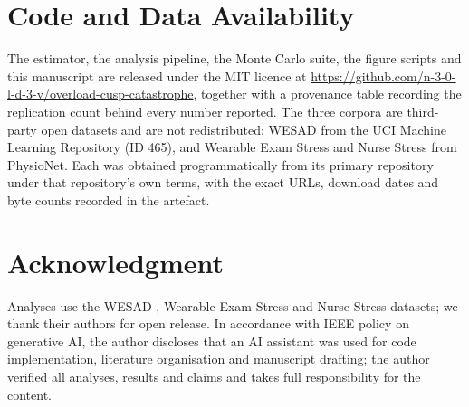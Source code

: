 \documentclass[conference]{IEEEtran}
\begin{document}
\section*{Code and Data Availability}
The estimator, the analysis pipeline, the Monte Carlo suite, the figure scripts
and this manuscript are released under the MIT licence at
\url{https://github.com/n-3-0-l-d-3-v/overload-cusp-catastrophe}, together with
a provenance table recording the replication count behind every number
reported. The three corpora are third-party open datasets and are not
redistributed: WESAD from the UCI Machine Learning Repository (ID 465), and
Wearable Exam Stress and Nurse Stress from PhysioNet. Each was obtained
programmatically from its primary repository under that repository's own terms,
with the exact URLs, download dates and byte counts recorded in the artefact.

\section*{Acknowledgment}
Analyses use the WESAD \cite{schmidt2018wesad}, Wearable Exam Stress
\cite{amin2022exam} and Nurse Stress \cite{hosseini2022nurse} datasets; we
thank their authors for open release. In accordance with IEEE policy on
generative AI, the author discloses that an AI assistant was used for code
implementation, literature organisation and manuscript drafting; the author
verified all analyses, results and claims and takes full responsibility for the
content.



\end{document}

